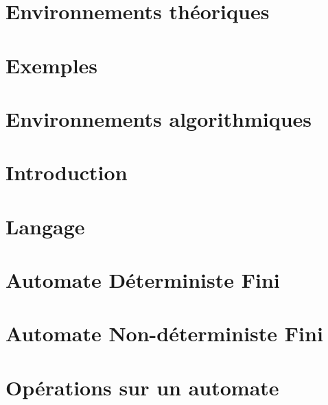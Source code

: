 

\newcommand{\student}{Benjamin André}
\newcommand{\grade}{MAB2 Sciences Informatiques}
\newcommand{\director}{Véronique Bruyère}
\renewcommand{\title}{Automates}
\renewcommand{\date}{\today}


	
		
	
	\tableofcontents
	\newpage
	
	\section*{Environnements théoriques}
	
	\section*{Exemples}
	
	\section*{Environnements algorithmiques}
	
	\newpage
	
	\section{Introduction}\label{sec:intro}
	\section{Langage}\label{sec:langage}
	\section{Automate Déterministe Fini}\label{sec:adf}
	\section{Automate Non-déterministe Fini}\label{sec:anf}
	\section{Opérations sur un automate}\label{sec:opauto}
	
	\newpage
	
	
	
